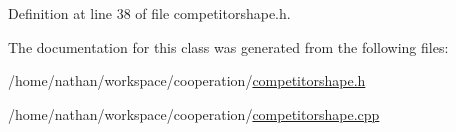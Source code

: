 Definition at line 38 of file competitorshape.h.



The documentation for this class was generated from the following files:\begin{DoxyCompactItemize}
\item 
/home/nathan/workspace/cooperation/\hyperlink{competitorshape_8h}{competitorshape.h}\item 
/home/nathan/workspace/cooperation/\hyperlink{competitorshape_8cpp}{competitorshape.cpp}\end{DoxyCompactItemize}
